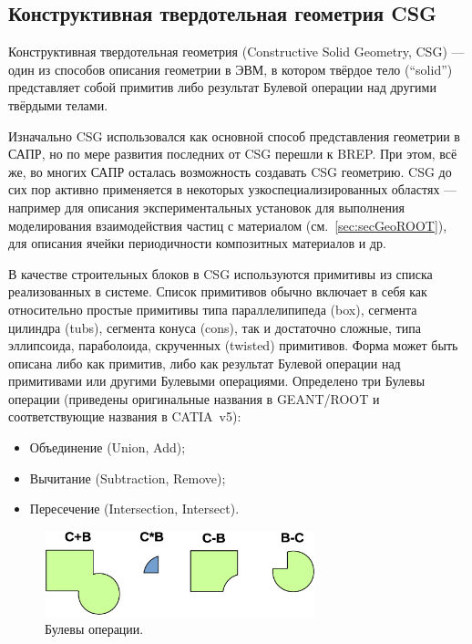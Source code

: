 \subsection{Конструктивная твердотельная геометрия CSG}\label{sec:secGeoCSG}

Конструктивная твердотельная геометрия (Constructive Solid Geometry, CSG) --- один из способов описания геометрии в ЭВМ, в котором твёрдое тело (``solid'') представляет собой примитив либо результат Булевой операции над другими твёрдыми телами.

Изначально CSG использовался как основной способ представления геометрии в САПР, но по мере развития последних от CSG перешли к BREP. При этом, всё же, во многих САПР осталась возможность создавать CSG геометрию. CSG до сих пор активно применяется в некоторых узкоспециализированных областях --- например для описания экспериментальных установок для выполнения моделирования взаимодействия частиц с материалом (см.~\ref{sec:secGeoROOT}), для описания ячейки периодичности композитных материалов и др.

В качестве строительных блоков в CSG используются примитивы из списка реализованных в системе. Список примитивов обычно включает в себя как относительно простые примитивы типа параллелипипеда (box), сегмента цилиндра (tubs), сегмента конуса (cons), так и достаточно сложные, типа эллипсоида, параболоида, скрученных (twisted) примитивов.
Форма может быть описана либо как примитив, либо как результат Булевой операции над примитивами или другими Булевыми операциями.
Определено три Булевы операции (приведены оригинальные названия в GEANT/ROOT и соответствующие названия в CATIA~v5):

\begin{itemize}
\item{Объединение (Union, Add);}
\item{Вычитание (Subtraction, Remove);}
\item{Пересечение (Intersection, Intersect).}
\end{itemize}

\begin{figure}[H]
\centering
\includegraphics[width=0.7\textwidth]{pictures/Boolean.eps}
\caption{Булевы операции.}
\label{fig:Boolean}
\end{figure}

